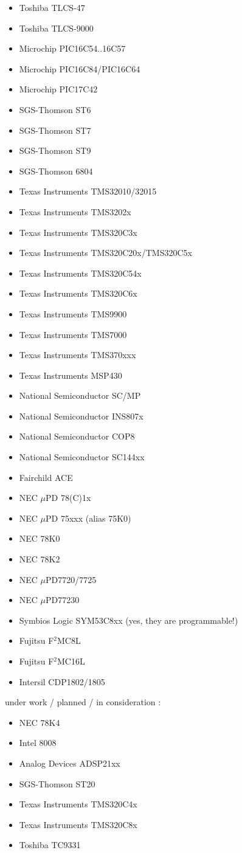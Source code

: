 \documentclass[12pt,twoside]{report}
\begin{document}
\begin{itemize}
\item{Toshiba TLCS-47}
\item{Toshiba TLCS-9000}
\item{Microchip PIC16C54..16C57}
\item{Microchip PIC16C84/PIC16C64}
\item{Microchip PIC17C42}
\item{SGS-Thomson ST6}
\item{SGS-Thomson ST7}
\item{SGS-Thomson ST9}
\item{SGS-Thomson 6804}
\item{Texas Instruments TMS32010/32015}
\item{Texas Instruments TMS3202x}
\item{Texas Instruments TMS320C3x}
\item{Texas Instruments TMS320C20x/TMS320C5x}
\item{Texas Instruments TMS320C54x}
\item{Texas Instruments TMS320C6x}
\item{Texas Instruments TMS9900}
\item{Texas Instruments TMS7000}
\item{Texas Instruments TMS370xxx}
\item{Texas Instruments MSP430}
\item{National Semiconductor SC/MP}
\item{National Semiconductor INS807x}
\item{National Semiconductor COP8}
\item{National Semiconductor SC144xx}
\item{Fairchild ACE}
\item{NEC $\mu$PD 78(C)1x}
\item{NEC $\mu$PD 75xxx (alias 75K0)}
\item{NEC 78K0}
\item{NEC 78K2}
\item{NEC $\mu$PD7720/7725}
\item{NEC $\mu$PD77230}
\item{Symbios Logic SYM53C8xx (yes, they are programmable!)}
\item{Fujitsu F$^2$MC8L}
\item{Fujitsu F$^2$MC16L}
\item{Intersil CDP1802/1805}
\end{itemize}
under work / planned / in consideration :
\begin{itemize}
\item{NEC 78K4}
\item{Intel 8008}
\item{Analog Devices ADSP21xx}
\item{SGS-Thomson ST20}
\item{Texas Instruments TMS320C4x}
\item{Texas Instruments TMS320C8x}
\item{Toshiba TC9331}
\end{itemize}
\end{document}
